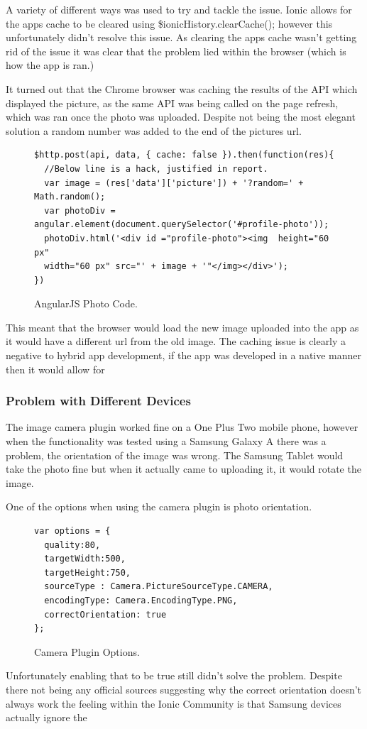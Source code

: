 A variety of different ways was used to try and tackle the issue. Ionic allows for the apps cache to be cleared using \$ionicHistory.clearCache(); however this unfortunately didn't resolve this issue. As clearing the apps cache wasn't getting rid of the issue it was clear that the problem lied within the browser (which is how the app is ran.)

It turned out that the Chrome browser was caching the results of the API which displayed the picture, as the same API was being called on the page refresh, which was ran once the photo was uploaded. Despite not being the most elegant solution a random number was added to the end of the pictures url.
\begin{figure}
\begin{verbatim}
$http.post(api, data, { cache: false }).then(function(res){
  //Below line is a hack, justified in report.
  var image = (res['data']['picture']) + '?random=' + Math.random();
  var photoDiv = angular.element(document.querySelector('#profile-photo'));
  photoDiv.html('<div id ="profile-photo"><img  height="60 px" 
  width="60 px" src="' + image + '"</img></div>');
})
\end{verbatim}
\caption{AngularJS Photo Code.}
\end{figure}


This meant that the browser would load the new image uploaded into the app as it would have a different url from the old image. The caching issue is clearly a negative to hybrid app development, if the app was developed in a native manner then it would allow for 

\subsubsection{Problem with Different Devices}
The image camera plugin worked fine on a One Plus Two mobile phone, however when the functionality was tested using a Samsung Galaxy A there was a problem, the orientation of the image was wrong. The Samsung Tablet would take the photo fine but when it actually came to uploading it, it would rotate the image. 

One of the options when using the camera plugin is photo orientation. 
\begin{figure}
\begin{verbatim}
var options = {
  quality:80,
  targetWidth:500,
  targetHeight:750,
  sourceType : Camera.PictureSourceType.CAMERA,
  encodingType: Camera.EncodingType.PNG,
  correctOrientation: true
};
\end{verbatim}
\caption{Camera Plugin Options.}
\end{figure}
Unfortunately enabling that to be true still didn't solve the problem. Despite there not being any official sources suggesting why the correct orientation doesn't always work the feeling within the Ionic Community is that Samsung devices actually ignore the  
